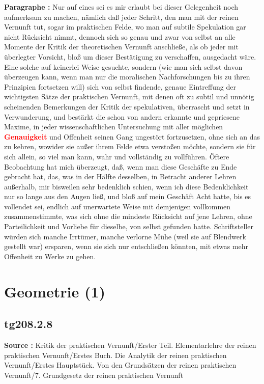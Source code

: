 \documentclass[a4paper,12pt,twoside]{book}
\newcommand{\match}[1]{\textcolor{red}{\textbf{#1}}}
\newcommand{\unnumberedsection}[1]{
	\section*{#1}
	\addcontentsline{toc}{section}{#1}
	\markright{#1}
}
\begin{document}
	\noindent\textbf{Paragraphe : }Nur auf eines sei es mir erlaubt bei dieser Gelegenheit noch aufmerksam zu machen, nämlich daß jeder Schritt, den man mit der reinen Vernunft tut, sogar im praktischen Felde, wo man auf subtile Spekulation gar nicht Rücksicht nimmt, dennoch sich so genau und zwar von selbst an alle Momente der Kritik der theoretischen Vernunft anschließe, als ob jeder mit überlegter Vorsicht, bloß um dieser Bestätigung zu verschaffen, ausgedacht wäre. Eine solche auf keinerlei Weise gesuchte, sondern (wie man sich selbst davon überzeugen kann, wenn man nur die moralischen Nachforschungen bis zu ihren Prinzipien fortsetzen will) sich von selbst findende, genaue Eintreffung der wichtigsten Sätze der praktischen Vernunft, mit denen oft zu subtil und unnötig scheinenden Bemerkungen der Kritik der spekulativen, überrascht und setzt in Verwunderung, und bestärkt die schon von andern erkannte und gepriesene Maxime, in jeder wissenschaftlichen Untersuchung mit aller möglichen \match{Genauigkeit} und Offenheit seinen Gang ungestört fortzusetzen,  ohne sich an das zu kehren, wowider sie außer ihrem Felde etwa verstoßen möchte, sondern sie für sich allein, so viel man kann, wahr und vollständig zu vollführen. Öftere Beobachtung hat mich überzeugt, daß, wenn man diese Geschäfte zu Ende gebracht hat, das, was in der Hälfte desselben, in Betracht anderer Lehren außerhalb, mir bisweilen sehr bedenklich schien, wenn ich diese Bedenklichkeit nur so lange aus den Augen ließ, und bloß auf mein Geschäft Acht hatte, bis es vollendet sei, endlich auf unerwartete Weise mit demjenigen vollkommen zusammenstimmte, was sich ohne die mindeste Rücksicht auf jene Lehren, ohne Parteilichkeit und Vorliebe für dieselbe, von selbst gefunden hatte. Schriftsteller würden sich manche Irrtümer, manche verlorne Mühe (weil sie auf Blendwerk gestellt war) ersparen, wenn sie sich nur entschließen könnten, mit etwas mehr Offenheit zu Werke zu gehen. 
	
	\unnumberedsection{Geometrie (1)} 
	\subsection*{tg208.2.8} 
	\textbf{Source : }Kritik der praktischen Vernunft/Erster Teil. Elementarlehre der reinen praktischen Vernunft/Erstes Buch. Die Analytik der reinen praktischen Vernunft/Erstes Hauptstück. Von den Grundsätzen der reinen praktischen Vernunft/7. Grundgesetz der reinen praktischen Vernunft\\  
	
\end{document}

